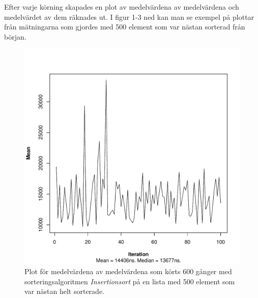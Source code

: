 \documentclass[a4paper]{article}
\begin{document}
Efter varje körning skapades en plot av medelvärdena av medelvärdena och medelvärdet av dem räknades ut. I figur 1-3 ned kan man se exempel på plottar från mätningarna som gjordes med 500 element som var nästan sorterad från början.

\begin{figure}[H]
	\begin{center}
		\includegraphics[scale=0.4]{output/500/AlmostSorted/insertionSort_almost_sorted_500_600_100.pdf}
		\caption{Plot för medelvärdena av medelvärdena som körts 600 gånger med sorteringsalgoritmen \emph{Insertionsort} på en lista med 500 element som var nästan helt sorterade.}
	\end{center}
\end{figure}
\end{document}

